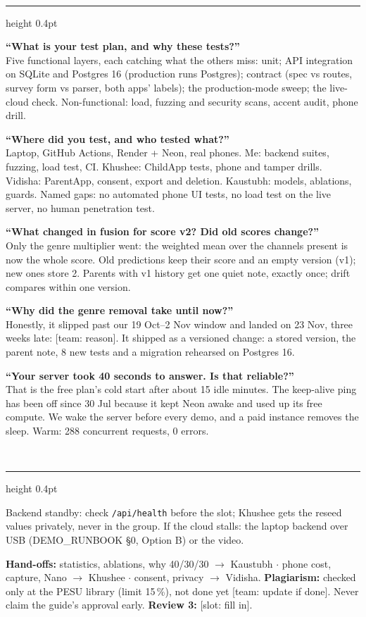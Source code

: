 \documentclass[10pt,a4paper]{article}
\newcommand{\sect}[1]{\vspace{2mm}{\color{teal}\bfseries\small\MakeUppercase{#1}}\\[0.6mm]\hrule height 0.4pt\vspace{1.2mm}}
\newcommand{\qa}[2]{\begin{minipage}{\linewidth}\small\textbf{\color{navy}#1}\\[0.3mm]\color{black!85}#2\end{minipage}\vspace{1.6mm}}
\begin{document}
\sect{Hardest Review 3 questions}
\qa{``What is your test plan, and why these tests?''}{Five functional layers, each catching what the others miss: unit; API integration on SQLite and Postgres 16 (production runs Postgres); contract (spec vs routes, survey form vs parser, both apps' labels); the production-mode sweep; the live-cloud check. Non-functional: load, fuzzing and security scans, accent audit, phone drill.}
\qa{``Where did you test, and who tested what?''}{Laptop, GitHub Actions, Render + Neon, real phones. Me: backend suites, fuzzing, load test, CI. Khushee: ChildApp tests, phone and tamper drills. Vidisha: ParentApp, consent, export and deletion. Kaustubh: models, ablations, guards. Named gaps: no automated phone UI tests, no load test on the live server, no human penetration test.}
\qa{``What changed in fusion for score v2? Did old scores change?''}{Only the genre multiplier went: the weighted mean over the channels present is now the whole score. Old predictions keep their score and an empty version (v1); new ones store 2. Parents with v1 history get one quiet note, exactly once; drift compares within one version.}
\qa{``Why did the genre removal take until now?''}{Honestly, it slipped past our 19 Oct--2 Nov window and landed on 23 Nov, three weeks late: [team: reason]. It shipped as a versioned change: a stored version, the parent note, 8 new tests and a migration rehearsed on Postgres 16.}
\qa{``Your server took 40 seconds to answer. Is that reliable?''}{That is the free plan's cold start after about 15 idle minutes. The keep-alive ping has been off since 30 Jul because it kept Neon awake and used up its free compute. We wake the server before every demo, and a paid instance removes the sleep. Warm: 288 concurrent requests, 0 errors.}

\sect{Demo role}
{\small Backend standby: check \texttt{/api/health} before the slot; Khushee gets the reseed values privately, never in the group. If the cloud stalls: the laptop backend over USB (DEMO\_RUNBOOK \S0, Option B) or the video.\par}

\vfill
{\color{greyt}\footnotesize \textbf{Hand-offs:} statistics, ablations, why 40/30/30 $\to$ Kaustubh $\cdot$ phone cost, capture, Nano $\to$ Khushee $\cdot$ consent, privacy $\to$ Vidisha. \textbf{Plagiarism:} checked only at the PESU library (limit 15\,\%), not done yet [team: update if done]. Never claim the guide's approval early. \textbf{Review 3:} [slot: fill in].\par}
\end{document}
